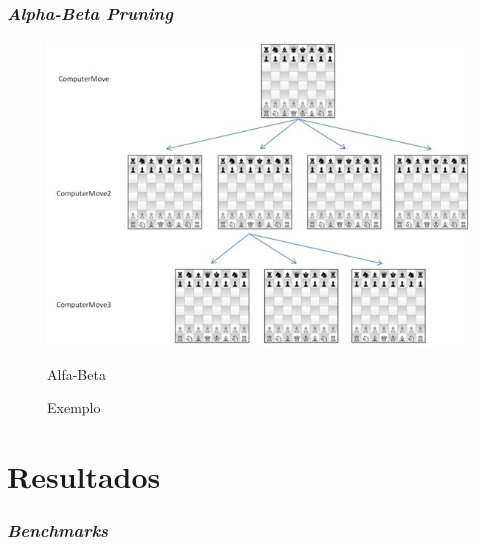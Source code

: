 \documentclass[yellow]{beamer}
\begin{document}
\begin{frame}
  \frametitle{\textit{Alpha-Beta Pruning}}
  \begin{figure}[!hpbt]
	  \centering
	  \begin{minipage}{0.8\textwidth}
		    \centering
		      \includegraphics[width=.8\linewidth]{huoChess_2.jpg}
		        \caption{Exemplo}{Alfa-Beta}
			  \label{fig:1}
		  \end{minipage}
	  \end{figure}
  \end{frame}


\section{Resultados}


\begin{frame}
	\frametitle{\textit{Benchmarks}}
\end{frame}
\end{document}
